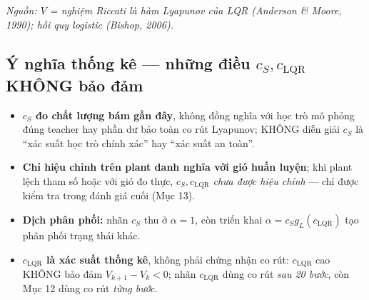 \documentclass[11pt]{article}
\newcommand{\cS}{c_{S}}
\newcommand{\cL}{c_{\mathrm{LQR}}}
\begin{document}
{\small\itshape Nguồn: $V$ = nghiệm Riccati là hàm Lyapunov của LQR (Anderson \& Moore, 1990); hồi quy
logistic (Bishop, 2006).}

\subsection{Ý nghĩa thống kê --- những điều $\cS,\cL$ KHÔNG bảo đảm}
\begin{itemize}[leftmargin=1.4em,itemsep=1pt]
\item \textbf{$\cS$ đo chất lượng bám gần đây}, không đồng nghĩa với học trò mô phỏng đúng teacher hay phần dư
bảo toàn co rút Lyapunov; KHÔNG diễn giải $\cS$ là ``xác suất học trò chính xác'' hay ``xác suất an toàn''.
\item \textbf{Chỉ hiệu chỉnh trên plant danh nghĩa với gió huấn luyện}; khi plant lệch tham số hoặc với gió đo
thực, $\cS,\cL$ \emph{chưa được hiệu chỉnh} --- chỉ được kiểm tra trong đánh giá cuối (Mục 13).
\item \textbf{Dịch phân phối:} nhãn $\cS$ thu ở $\alpha=1$, còn triển khai $\alpha=\cS g_L(\cL)$ tạo phân phối
trạng thái khác.
\item \textbf{$\cL$ là xác suất thống kê}, không phải chứng nhận co rút: $\cL$ cao KHÔNG bảo đảm
$V_{k+1}-V_k<0$; nhãn $\cL$ dùng co rút \emph{sau 20 bước}, còn Mục 12 dùng co rút \emph{từng bước}.
\end{itemize}

\end{document}
